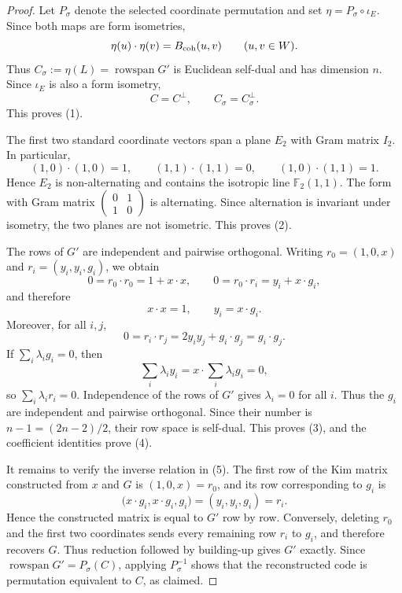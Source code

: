 \documentclass[12pt]{article}
\begin{document}
\begin{proof}
Let \(P_\sigma\) denote the selected coordinate permutation and set
\(\eta=P_\sigma\circ\iota_E\). Since both maps are form isometries,
\[
\eta(u)\cdot\eta(v)=B_{\rm coh}(u,v)
\qquad(u,v\in W).
\]
Thus \(C_\sigma:=\eta(L)=\operatorname{rowspan}G'\) is Euclidean
self-dual and has dimension \(n\). Since \(\iota_E\) is also a form
isometry,
\[
C=C^\perp,
\qquad
C_\sigma=C_\sigma^\perp.
\]
This proves (1).

The first two standard coordinate vectors span a plane \(E_2\) with Gram
matrix \(I_2\). In particular,
\[
(1,0)\cdot(1,0)=1,\qquad
(1,1)\cdot(1,1)=0,\qquad
(1,0)\cdot(1,1)=1.
\]
Hence \(E_2\) is non-alternating and contains the isotropic line
\(\mathbb F_2(1,1)\). The form with Gram matrix
\(\left(\begin{smallmatrix}0&1\\1&0\end{smallmatrix}\right)\) is
alternating. Since alternation is invariant under isometry, the two planes
are not isometric. This proves (2).

The rows of \(G'\) are independent and pairwise orthogonal. Writing
\(r_0=(1,0,x)\) and \(r_i=(y_i,y_i,g_i)\), we obtain
\[
0=r_0\cdot r_0=1+x\cdot x,
\qquad
0=r_0\cdot r_i=y_i+x\cdot g_i,
\]
and therefore
\[
x\cdot x=1,
\qquad y_i=x\cdot g_i.
\]
Moreover, for all \(i,j\),
\[
0=r_i\cdot r_j=2y_iy_j+g_i\cdot g_j=g_i\cdot g_j.
\]
If \(\sum_i\lambda_i g_i=0\), then
\[
\sum_i\lambda_i y_i
=x\cdot\sum_i\lambda_i g_i=0,
\]
so \(\sum_i\lambda_i r_i=0\). Independence of the rows of \(G'\) gives
\(\lambda_i=0\) for all \(i\). Thus the \(g_i\) are independent and
pairwise orthogonal. Since their number is \(n-1=(2n-2)/2\), their row
space is self-dual. This proves (3), and the coefficient identities prove
(4).

It remains to verify the inverse relation in (5).  The first row of the
Kim matrix constructed from \(x\) and \(G\) is \((1,0,x)=r_0\), and its
row corresponding to \(g_i\) is
\[
 \bigl(x\mathbin{\cdot}g_i,x\mathbin{\cdot}g_i,g_i\bigr)
   =(y_i,y_i,g_i)=r_i.
\]
Hence the constructed matrix is equal to \(G'\) row by row.  Conversely,
deleting \(r_0\) and the first two coordinates sends every remaining row
\(r_i\) to \(g_i\), and therefore recovers \(G\).  Thus reduction followed
by building-up gives \(G'\) exactly.  Since
\(\operatorname{rowspan}G'=P_\sigma(C)\), applying \(P_\sigma^{-1}\)
shows that the reconstructed code is permutation equivalent to \(C\), as
claimed.
\end{proof}
\end{document}

